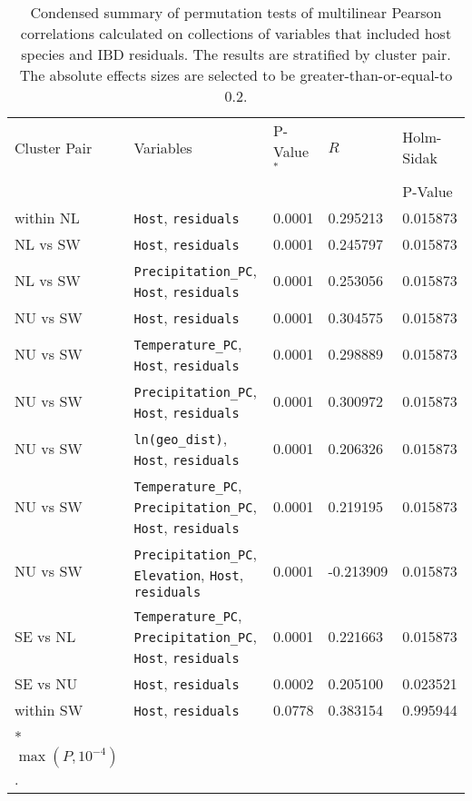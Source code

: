 \documentclass[
  letterpaper,
  DIV=11,
  numbers=noendperiod]{scrreprt}
\begin{document}
\begin{table}[H]
\caption{Condensed summary of permutation tests of multilinear Pearson correlations calculated on collections of variables that included host species and IBD residuals. The results are stratified by cluster pair. The absolute effects sizes are selected to be greater-than-or-equal-to 0.2.}
\tiny
\centering
\begin{tabular}{lllll}
\hline
Cluster Pair &                                                                    Variables &  P-Value$^*$ &     $R$ &  Holm-Sidak \\
 & & & & P-Value\\
\hline
    within NL &                                                            \texttt{Host}, \texttt{residuals} &  0.0001 &  0.295213 &    0.015873 \\
   NL vs SW &                                                            \texttt{Host}, \texttt{residuals} &  0.0001 &  0.245797 &    0.015873 \\
   NL vs SW &                                          \texttt{Precipitation\_PC}, \texttt{Host}, \texttt{residuals} &  0.0001 &  0.253056 &    0.015873 \\
   NU vs SW &                                                            \texttt{Host}, \texttt{residuals} &  0.0001 &  0.304575 &    0.015873 \\
   NU vs SW &                                            \texttt{Temperature\_PC}, \texttt{Host}, \texttt{residuals} &  0.0001 &  0.298889 &    0.015873 \\
   NU vs SW &                                          \texttt{Precipitation\_PC}, \texttt{Host}, \texttt{residuals} &  0.0001 &  0.300972 &    0.015873 \\
   NU vs SW &                                              \texttt{ln(geo\_dist)}, \texttt{Host}, \texttt{residuals} &  0.0001 &  0.206326 &    0.015873 \\
   NU vs SW &                         \texttt{Temperature\_PC}, \texttt{Precipitation\_PC}, \texttt{Host}, \texttt{residuals} &  0.0001 &  0.219195 &    0.015873 \\
   NU vs SW &                               \texttt{Precipitation\_PC},  \texttt{Elevation}, \texttt{Host}, \texttt{residuals} &  0.0001 & -0.213909 &    0.015873 \\
   SE vs NL &                          \texttt{Temperature\_PC}, \texttt{Precipitation\_PC}, \texttt{Host}, \texttt{residuals} &  0.0001 &  0.221663 &    0.015873 \\
   SE vs NU &                                                           \texttt{Host}, \texttt{residuals} &  0.0002 &  0.205100 &    0.023521 \\
   within SW & \texttt{Host}, \texttt{residuals} & 0.0778 & 0.383154 & 0.995944 \\
\hline
 * $\max (P, 10^{-4})$. & & & & \\
\end{tabular}

\end{table}
\end{document}
